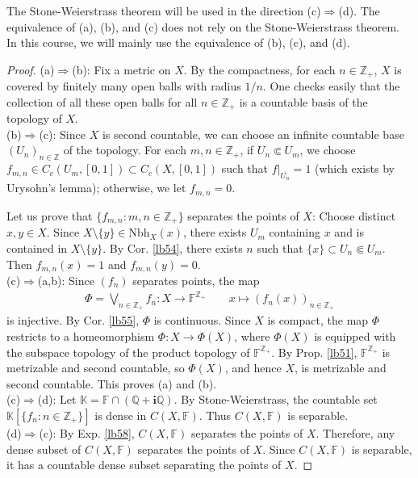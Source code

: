\documentclass[12pt,b5paper,notitlepage]{article}
\theoremstyle{definition}
\theoremstyle{plain}
\newcommand{\ovl}{\overline}
\newcommand{\im}{\mathbf{i}}
\newcommand{\Kbb}{\mathbb K}
\newcommand{\Zbb}{\mathbb Z}
\newcommand{\Qbb}{\mathbb Q}
\newcommand{\Fbb}{\mathbb F}
\newcommand{\Nbh}{\mathrm{Nbh}}
\numberwithin{equation}{section}
\begin{document}
The Stone-Weierstrass theorem will be used in the direction (c)$\Rightarrow$(d). The equivalence of (a), (b), and (c) does not rely on the Stone-Weierstrass theorem. In this course, we will mainly use the equivalence of (b), (c), and (d).

\begin{proof}
(a)$\Rightarrow$(b): Fix a metric on $X$. By the compactness, for each $n\in\Zbb_+$, $X$ is covered by finitely many open balls with radius $1/n$. One checks easily that the collection of all these open balls for all $n\in\Zbb_+$ is a countable basis of the topology of $X$.\\[-1ex]

(b)$\Rightarrow$(c): Since $X$ is second countable, we can choose an infinite countable base $(U_n)_{n\in\Zbb}$ of the topology. For each $m,n\in\Zbb_+$, if $U_n\Subset U_m$, we choose $f_{m,n}\in C_c(U_m,[0,1])\subset C_c(X,[0,1])$ such that $f|_{\ovl {U_n}}=1$ (which exists by Urysohn's lemma); otherwise, we let $f_{m,n}=0$. 

Let us prove that $\{f_{m,n}:m,n\in\Zbb_+\}$ separates the points of $X$: Choose distinct $x,y\in X$. Since $X\setminus\{y\}\in\Nbh_X(x)$, there exists $U_m$ containing $x$ and is contained in $X\setminus\{y\}$. By Cor. \ref{lb54}, there exists $n$ such that $\{x\}\subset U_n\Subset U_m$. Then $f_{m,n}(x)=1$ and $f_{m,n}(y)=0$.\\[-1ex]

(c)$\Rightarrow$(a,b): Since $(f_n)$ separates points, the map
\begin{gather*}
\Phi=\bigvee_{n\in\Zbb_+} f_n:X\rightarrow\Fbb^{\Zbb_+}\qquad x\mapsto (f_n(x))_{n\in\Zbb_+}
\end{gather*}
is injective. By Cor. \ref{lb55}, $\Phi$ is continuous. Since $X$ is compact, the map $\Phi$ restricts to a homeomorphism $\Phi:X\rightarrow\Phi(X)$, where $\Phi(X)$ is equipped with the subspace topology of the product topology of $\Fbb^{\Zbb_+}$. By Prop. \ref{lb51}, $\Fbb^{\Zbb_+}$ is metrizable and second countable, so $\Phi(X)$, and hence $X$, is metrizable and second countable. This proves (a) and (b).\\[-1ex]


(c)$\Rightarrow$(d): Let $\Kbb=\Fbb\cap(\Qbb+\im\Qbb)$. By Stone-Weierstrass, the countable set $\Kbb[\{f_n:n\in\Zbb_+\}]$ is dense in $C(X,\Fbb)$. Thus $C(X,\Fbb)$ is separable.\\[-1ex]

(d)$\Rightarrow$(c): By Exp. \ref{lb58}, $C(X,\Fbb)$ separates the points of $X$. Therefore, any dense subset of $C(X,\Fbb)$ separates the points of $X$. Since $C(X,\Fbb)$ is separable, it has a countable dense subset separating the points of $X$.
\end{proof}
\end{document}
